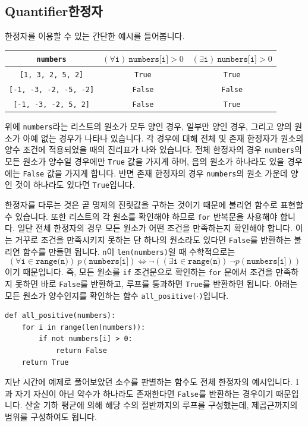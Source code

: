 \documentclass[../main.tex]{subfiles}
\begin{document}
\subsection{Quantifier한정자}
한정자를 이용할 수 있는 간단한 예시를 들어봅니다.
\begin{table}[H]
    \centering
    \begin{tabular}{c|c|c}
        \texttt{numbers} & $(\forall \texttt{i})\ \texttt{numbers[i]}>0$ & $(\exists \texttt{i})\ \texttt{numbers[i]}>0$\\ \hline
        \texttt{[1, 3, 2, 5, 2]} & \texttt{True} & \texttt{True}\\
        \texttt{[-1, -3, -2, -5, -2]} & \texttt{False} & \texttt{False} \\
        \texttt{[-1, -3, -2, 5, 2]} & \texttt{False} & \texttt{True}
    \end{tabular}
\end{table}
위에 \texttt{numbers}라는 리스트의 원소가 모두 양인 경우, 일부만 양인 경우, 그리고 양의 원소가 아예 없는 경우가 나타나 있습니다.
각 경우에 대해 전체 및 존재 한정자가 원소의 양수 조건에 적용되었을 때의 진리표가 나와 있습니다.
전체 한정자의 경우 \texttt{numbers}의 모든 원소가 양수일 경우에만 \texttt{True} 값을 가지게 하며, 음의 원소가 하나라도 있을 경우에는 \texttt{False} 값을 가지게 합니다.
반면 존재 한정자의 경우 \texttt{numbers}의 원소 가운데 양인 것이 하나라도 있다면 \texttt{True}입니다.

한정자를 다루는 것은 곧 명제의 진릿값을 구하는 것이기 때문에 불리언 함수로 표현할 수 있습니다.
또한 리스트의 각 원소를 확인해야 하므로 \texttt{for} 반복문을 사용해야 합니다.
일단 전체 한정자의 경우 모든 원소가 어떤 조건을 만족하는지 확인해야 합니다.
이는 거꾸로 조건을 만족시키지 못하는 단 하나의 원소라도 있다면 \texttt{False}를 반환하는 불리언 함수를 만들면 됩니다.
\texttt{n}이 \texttt{len(numbers)}일 때 수학적으로는
\[
(\forall \texttt{i} \in \texttt{range(n)})\ p(\texttt{numbers[i]}) \Leftrightarrow \neg\left((\exists \texttt{i} \in \texttt{range(n)})\ \neg p(\texttt{numbers[i]})\right)
\]
이기 때문입니다.
즉, 모든 원소를  \texttt{if} 조건문으로 확인하는 \texttt{for} 문에서 조건을 만족하지 못하면 바로 \texttt{False}를 반환하고, 루프를 통과하면 \texttt{True}를 반환하면 됩니다.
아래는 모든 원소가 양수인지를 확인하는 함수 \texttt{all\_positive($\cdot$)}입니다.
\begin{verbatim}
def all_positive(numbers):
    for i in range(len(numbers)):
        if not numbers[i] > 0:
            return False
    return True
\end{verbatim}
지난 시간에 예제로 풀어보았던 소수를 판별하는 함수도 전체 한정자의 예시입니다.
1과 자기 자신이 아닌 약수가 하나라도 존재한다면 \texttt{False}를 반환하는 경우이기 때문입니다.
산술 기하 평균에 의해 해당 수의 절반까지의 루프를 구성했는데, 제곱근까지의 범위를 구성하여도 됩니다.
\end{document}
